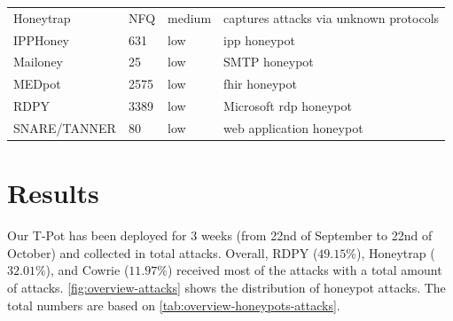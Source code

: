 \begin{table}
\begin{tabularx}{\linewidth}{l|XlX}
        Honeytrap \cite{honeytrap2021}            & NFQ                                                                                                         & medium                     & captures attacks via unknown protocols                                               \\
        IPPHoney \cite{ipphoney2021}              & 631                                                                                                         & low                        & \ac{ipp} honeypot                                                                    \\
        Mailoney \cite{mailoney2021}              & 25                                                                                                          & low                        & SMTP honeypot                                                                        \\
        MEDpot \cite{medpot2021}                  & 2575                                                                                                        & low                        & \ac{fhir} honeypot                                                                   \\
        RDPY \cite{rdpy2021}                      & 3389                                                                                                        & low                        & Microsoft \ac{rdp} honeypot                                                          \\
        SNARE/TANNER \cite{snare2021}             & 80                                                                                                          & low                        & web application honeypot                                                             \\
        \bottomrule
    \end{tabularx}
    \label{tab:overview-honeypots}
\end{table}

\section{Results}
\label{sec:honeypots-heicloud}

Our T-Pot has been deployed for 3 weeks (from 22nd of September to 22nd of October) and collected in total  attacks.
Overall, RDPY ($49.15\%$), Honeytrap ($32.01\%$), and Cowrie ($11.97\%$) received most of the attacks with a total amount of  attacks.
\autoref{fig:overview-attacks} shows the distribution of honeypot attacks.
The total numbers are based on \autoref{tab:overview-honeypots-attacks}.

